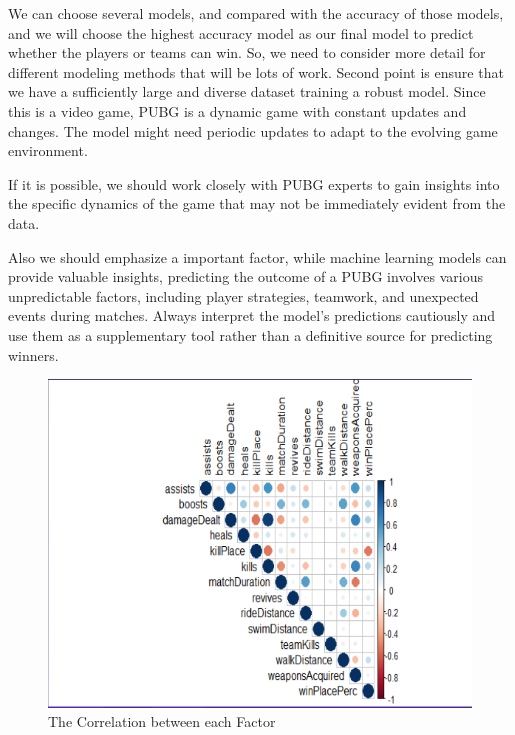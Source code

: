 \documentclass[12pt]{article}
\begin{document}
We can choose several models, and compared with the accuracy of those models, and we will choose the highest accuracy model as our final model to predict whether the players or teams can win. So, we need to consider more detail for different modeling methods that will be lots of work.
Second point is ensure that we have a sufficiently large and diverse dataset training a robust model.
Since this is a video game, PUBG is a dynamic game with constant updates and changes. The model might need periodic updates to adapt to the evolving game environment.

If it is possible, we should work closely with PUBG experts to gain insights into the specific dynamics of the game that may not be immediately evident from the data.

Also we should emphasize a important factor, while machine learning models can provide valuable insights, predicting the outcome of a PUBG  involves various unpredictable factors, including player strategies, teamwork, and unexpected events during matches. Always interpret the model's predictions cautiously and use them as a supplementary tool rather than a definitive source for predicting winners.


\begin{figure}[tbp]
	\centering
	\includegraphics[width=\textwidth]{Correlation.png}
	\caption{The Correlation between each Factor}
	\label{fig:Correlation}
\end{figure}



\end{document}
